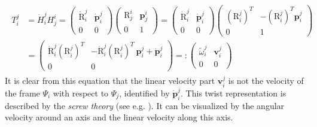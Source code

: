\documentclass[a4paper,twoside, openright,12pt]{report}
\newcommand{\f}[1]{\boldsymbol{#1}}
\newcommand{\g}[1]{\text{#1}}
\begin{document}
{\begin{eqnarray}\label{EQ:twistdecomposition}
\begin{aligned}
T_i^j &= \dot{H}_i^j H_j^i =
\begin{pmatrix}
\dot{\g{R}}_i^j & \dot{\f{p}}_i^j \\ 0 & 0
\end{pmatrix}
\begin{pmatrix}
\g{R}_j^i & \f{p}_j^i \\ 0 & 1
\end{pmatrix} = 
\begin{pmatrix}
\dot{\g{R}}_i^j & \dot{\f{p}}_i^j \\ 0 & 0
\end{pmatrix}
\begin{pmatrix}
(\g{R}_i^j)^T & -(\g{R}_i^j)^T \f{p}_i^j \\ 0 & 1
\end{pmatrix} \\ 
&= 
\begin{pmatrix}
\dot{\g{R}}_i^j(\g{R}_i^j)^T & -\dot{\g{R}}_i^j(\g{R}_i^j)^T\ \f{p}_i^j + \dot{\f{p}}_i^j \\ 0 & 0
\end{pmatrix} =: 
\begin{pmatrix}
\tilde{\omega}_i^j & \f{v}_i^j \\ 0 & 0
\end{pmatrix}
\end{aligned}
\end{eqnarray}
It is clear from this equation that the linear velocity part $\f{v}_i^j$ is not the velocity of the frame $\Psi_i$ with respect to $\Psi_j$, identified by $\dot{\f{p}}_i^j$. This twist representation is described by the \emph{screw theory} (see e.g. \cite{KinematicsHandbook}). It can be visualized by the angular velocity around an axis and the linear velocity along this axis.



}
\end{document}
